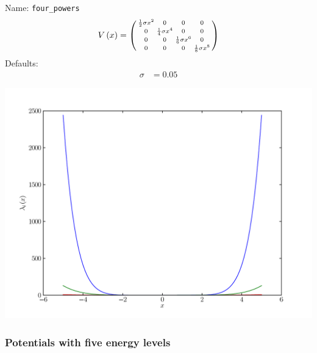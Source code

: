 \documentclass[a4paper,10pt]{report}
\begin{document}
\begin{minipage}{0.5\linewidth}
  Name:    \texttt{four\_powers}
  \begin{equation*}
    V\left( x \right) = \left(\begin{smallmatrix}\frac{1}{2} \sigma x^{2} & 0 & 0 & 0\\0 & \frac{1}{4} \sigma x^{4} & 0 & 0\\0 & 0 & \frac{1}{6} \sigma x^{6} & 0\\0 & 0 & 0 & \frac{1}{8} \sigma x^{8}\end{smallmatrix}\right)
  \end{equation*}
  Defaults:
  \begin{align*}
    \sigma & = 0.05
  \end{align*}
\end{minipage}
\begin{minipage}{0.5\linewidth}
  \begin{center}
    \includegraphics[scale=0.25]{./fig/four_powers.pdf}
  \end{center}
\end{minipage}


\subsubsection{Potentials with five energy levels}
\end{document}
